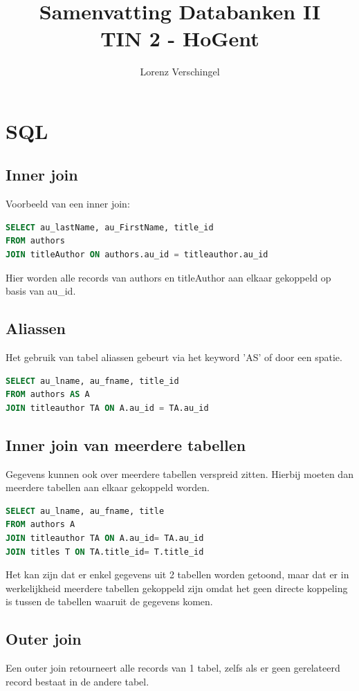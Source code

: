 \documentclass[a4paper,12pt]{article}
\title{Samenvatting Databanken II \\ \large TIN 2 - HoGent}
\author{Lorenz Verschingel}
\begin{document}
\maketitle

\section{SQL}

\subsection{Inner join}
Voorbeeld van een inner join:
\begin{lstlisting}[language=sql]
SELECT au_lastName, au_FirstName, title_id
FROM authors
JOIN titleAuthor ON authors.au_id = titleauthor.au_id
\end{lstlisting}
Hier worden alle records van authors en titleAuthor aan elkaar gekoppeld op basis van au\_id.

\subsection{Aliassen}
Het gebruik van tabel aliassen gebeurt via het keyword 'AS' of door een spatie.

\begin{lstlisting}[language=sql]
SELECT au_lname, au_fname, title_id
FROM authors AS A
JOIN titleauthor TA ON A.au_id = TA.au_id
\end{lstlisting}

\subsection{Inner join van meerdere tabellen}
Gegevens kunnen ook over meerdere tabellen verspreid zitten. Hierbij moeten dan meerdere tabellen aan elkaar gekoppeld worden.
\begin{lstlisting}[language=sql]
SELECT au_lname, au_fname, title
FROM authors A
JOIN titleauthor TA ON A.au_id= TA.au_id
JOIN titles T ON TA.title_id= T.title_id
\end{lstlisting}
Het kan zijn dat er enkel gegevens uit 2 tabellen worden getoond, maar dat er in werkelijkheid meerdere tabellen gekoppeld zijn omdat het geen directe koppeling is tussen de tabellen waaruit de gegevens komen.

\subsection{Outer join}
Een outer join retourneert alle records van 1 tabel, zelfs als er geen gerelateerd record bestaat in de andere tabel.
\end{document}

